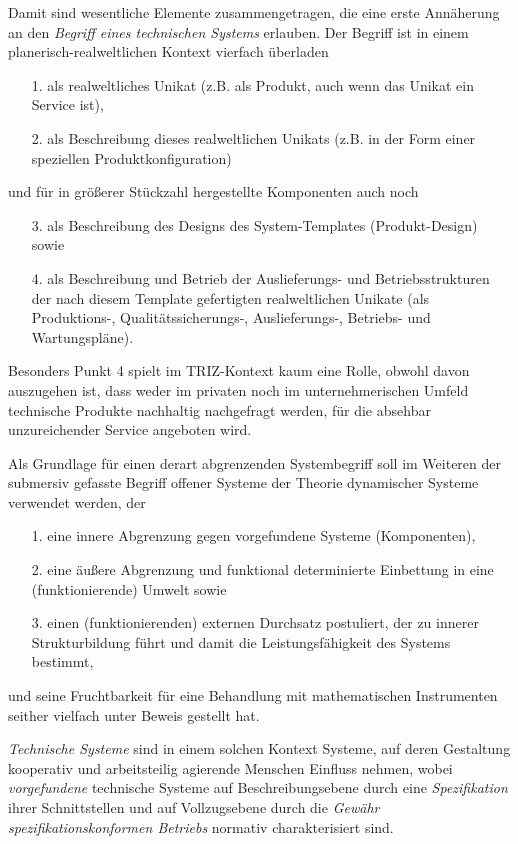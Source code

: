 \documentclass[11pt,a4paper]{article}
\begin{document}
Damit sind wesentliche Elemente zusammengetragen, die eine erste Annäherung an
den \emph{Begriff eines technischen Systems} erlauben.  Der Begriff ist in
einem planerisch-realweltlichen Kontext vierfach überladen
\begin{itemize}
\item [1.] als realweltliches Unikat (z.B. als Produkt, auch wenn das Unikat
  ein Service ist),
\item [2.] als Beschreibung dieses realweltlichen Unikats (z.B. in der Form
  einer speziellen Produktkonfiguration)
\end{itemize}
und für in größerer Stückzahl hergestellte Komponenten auch noch
\begin{itemize}
\item [3.] als Beschreibung des Designs des System-Templates (Produkt-Design)
  sowie
\item [4.] als Beschreibung und Betrieb der Auslieferungs- und
  Betriebsstrukturen der nach diesem Template gefertigten realweltlichen
  Unikate (als Produktions-, Qualitätssicherungs-, Auslieferungs-, Betriebs-
  und Wartungspläne).
\end{itemize}
Besonders Punkt 4 spielt im TRIZ-Kontext kaum eine Rolle, obwohl davon
auszugehen ist, dass weder im privaten noch im unternehmerischen Umfeld
technische Produkte nachhaltig nachgefragt werden, für die absehbar
unzureichender Service angeboten wird.

Als Grundlage für einen derart abgrenzenden Systembegriff soll im Weiteren der
submersiv gefasste Begriff offener Systeme der Theorie dynamischer Systeme
\cite{Bertalanffy1950} verwendet werden, der
\begin{itemize}
\item [1.] eine innere Abgrenzung gegen vorgefundene Systeme (Komponenten), 
\item [2.] eine äußere Abgrenzung und funktional determinierte Einbettung in
  eine (funktionierende) Umwelt sowie
\item [3.] einen (funktionierenden) externen Durchsatz postuliert, der zu
  innerer Strukturbildung führt und damit die Leistungsfähigkeit des Systems
  bestimmt,
\end{itemize}
und seine Fruchtbarkeit für eine Behandlung mit mathematischen Instrumenten
seither vielfach unter Beweis gestellt hat.  

\emph{Technische Systeme} sind in einem solchen Kontext Systeme, auf deren
Gestaltung kooperativ und arbeitsteilig agierende Menschen Einfluss nehmen,
wobei \emph{vorgefundene} technische Systeme auf Beschreibungsebene durch eine
\emph{Spezifikation} ihrer Schnittstellen und auf Vollzugsebene durch die
\emph{Gewähr spezifikationskonformen Betriebs} normativ charakterisiert sind.
\end{document}
